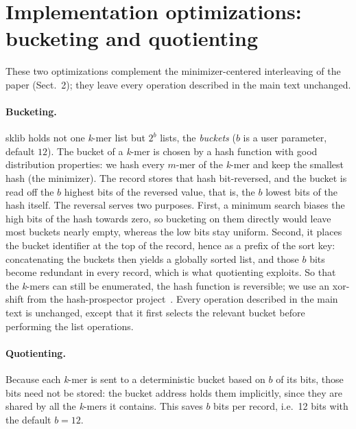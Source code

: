 \documentclass[runningheads,a4paper]{llncs}
\newcommand{\kmer}{\emph{k}-mer\xspace}
\newcommand{\kmers}{\emph{k}-mers\xspace}
\newcommand{\sklib}{\textsf{sklib}\xspace}
\newif\ifrevmarkup\revmarkupfalse
\newcommand{\rev}[1]{\ifrevmarkup\textcolor{blue}{#1}\else#1\fi}
\begin{document}
\section{Implementation optimizations: bucketing and quotienting}
\label{app:opt}
These two optimizations complement the minimizer-centered interleaving of the paper (Sect.~2); they leave every operation described in the main text unchanged.

\paragraph{Bucketing.}
\sklib{} holds not one \kmer list but $2^b$ lists, the \emph{buckets} ($b$ is a user parameter, default $12$). The bucket of a \kmer is chosen by a hash function with good distribution properties: \rev{we hash every $m$-mer of the \kmer and keep the smallest hash (the minimizer). The record stores that hash bit-reversed, and the bucket is read off the $b$ highest bits of the reversed value, that is, the $b$ lowest bits of the hash itself. The reversal serves two purposes. First, a minimum search biases the high bits of the hash towards zero, so bucketing on them directly would leave most buckets nearly empty, whereas the low bits stay uniform. Second, it places the bucket identifier at the top of the record, hence as a prefix of the sort key: concatenating the buckets then yields a globally sorted list, and those $b$ bits become redundant in every record, which is what quotienting exploits.} So that the \kmers can still be enumerated, the hash function is reversible; we use an xor-shift from the hash-prospector project~\cite{hashprospector}. Every operation described in the main text is unchanged, except that it first selects the relevant bucket before performing the list operations.

\paragraph{Quotienting.}
Because each \kmer is sent to a deterministic bucket based on $b$ of its bits, those bits need not be stored: the bucket address holds them implicitly, since they are shared by all the \kmers it contains. \rev{This saves $b$ bits per record, i.e.\ 12 bits with the default $b{=}12$.}
\end{document}
